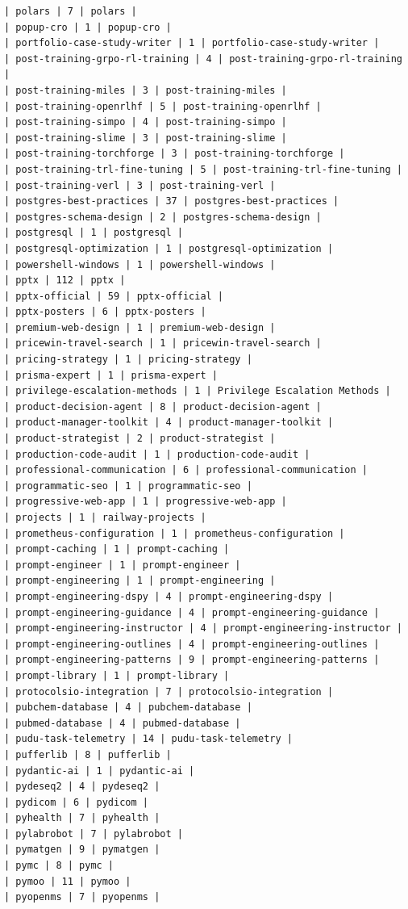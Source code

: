 \begin{Verbatim}[breaklines,breakanywhere,fontsize=\footnotesize]
| polars | 7 | polars |
| popup-cro | 1 | popup-cro |
| portfolio-case-study-writer | 1 | portfolio-case-study-writer |
| post-training-grpo-rl-training | 4 | post-training-grpo-rl-training |
| post-training-miles | 3 | post-training-miles |
| post-training-openrlhf | 5 | post-training-openrlhf |
| post-training-simpo | 4 | post-training-simpo |
| post-training-slime | 3 | post-training-slime |
| post-training-torchforge | 3 | post-training-torchforge |
| post-training-trl-fine-tuning | 5 | post-training-trl-fine-tuning |
| post-training-verl | 3 | post-training-verl |
| postgres-best-practices | 37 | postgres-best-practices |
| postgres-schema-design | 2 | postgres-schema-design |
| postgresql | 1 | postgresql |
| postgresql-optimization | 1 | postgresql-optimization |
| powershell-windows | 1 | powershell-windows |
| pptx | 112 | pptx |
| pptx-official | 59 | pptx-official |
| pptx-posters | 6 | pptx-posters |
| premium-web-design | 1 | premium-web-design |
| pricewin-travel-search | 1 | pricewin-travel-search |
| pricing-strategy | 1 | pricing-strategy |
| prisma-expert | 1 | prisma-expert |
| privilege-escalation-methods | 1 | Privilege Escalation Methods |
| product-decision-agent | 8 | product-decision-agent |
| product-manager-toolkit | 4 | product-manager-toolkit |
| product-strategist | 2 | product-strategist |
| production-code-audit | 1 | production-code-audit |
| professional-communication | 6 | professional-communication |
| programmatic-seo | 1 | programmatic-seo |
| progressive-web-app | 1 | progressive-web-app |
| projects | 1 | railway-projects |
| prometheus-configuration | 1 | prometheus-configuration |
| prompt-caching | 1 | prompt-caching |
| prompt-engineer | 1 | prompt-engineer |
| prompt-engineering | 1 | prompt-engineering |
| prompt-engineering-dspy | 4 | prompt-engineering-dspy |
| prompt-engineering-guidance | 4 | prompt-engineering-guidance |
| prompt-engineering-instructor | 4 | prompt-engineering-instructor |
| prompt-engineering-outlines | 4 | prompt-engineering-outlines |
| prompt-engineering-patterns | 9 | prompt-engineering-patterns |
| prompt-library | 1 | prompt-library |
| protocolsio-integration | 7 | protocolsio-integration |
| pubchem-database | 4 | pubchem-database |
| pubmed-database | 4 | pubmed-database |
| pudu-task-telemetry | 14 | pudu-task-telemetry |
| pufferlib | 8 | pufferlib |
| pydantic-ai | 1 | pydantic-ai |
| pydeseq2 | 4 | pydeseq2 |
| pydicom | 6 | pydicom |
| pyhealth | 7 | pyhealth |
| pylabrobot | 7 | pylabrobot |
| pymatgen | 9 | pymatgen |
| pymc | 8 | pymc |
| pymoo | 11 | pymoo |
| pyopenms | 7 | pyopenms |

\end{Verbatim}
